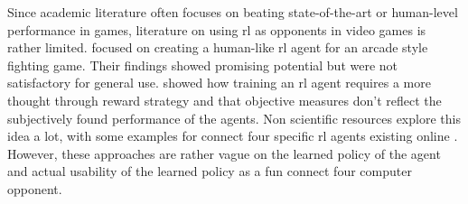 Since academic literature often focuses on beating state-of-the-art or human-level performance in games, literature on using \gls{rl} as opponents in video games is rather limited.
 focused on creating a human-like \gls{rl} agent for an arcade style fighting game.
Their findings showed promising potential but were not satisfactory for general use.
 showed how training an \gls{rl} agent requires a more thought through reward strategy and that objective measures don't reflect the subjectively found performance of the agents.
Non scientific resources explore this idea a lot, with some examples for connect four specific \gls{rl} agents existing online \citep{connectfour_rl, connectfour_cnn}.
However, these approaches are rather vague on the learned policy of the agent and actual usability of the learned policy as a fun connect four computer opponent. 